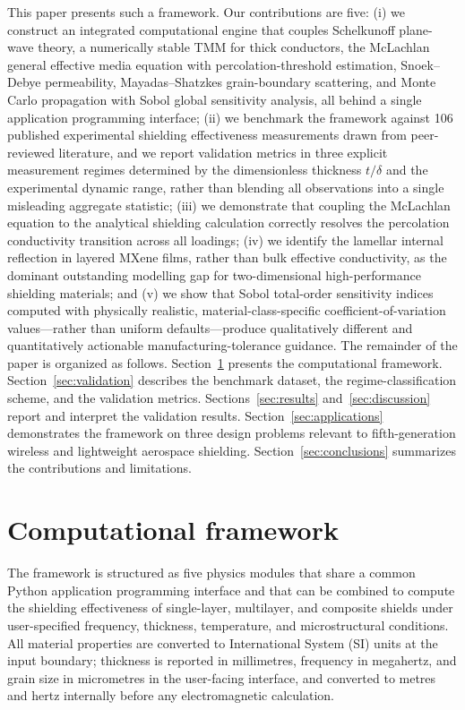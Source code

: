 \documentclass[review,3p,authoryear]{elsarticle}
\begin{document}
This paper presents such a framework. Our contributions are five: (i) we construct an integrated computational engine that couples Schelkunoff plane-wave theory, a numerically stable TMM for thick conductors, the McLachlan general effective media equation with percolation-threshold estimation, Snoek--Debye permeability, Mayadas--Shatzkes grain-boundary scattering, and Monte Carlo propagation with Sobol global sensitivity analysis, all behind a single application programming interface; (ii) we benchmark the framework against \num{106} published experimental shielding effectiveness measurements drawn from peer-reviewed literature, and we report validation metrics in three explicit measurement regimes determined by the dimensionless thickness $t/\delta$ and the experimental dynamic range, rather than blending all observations into a single misleading aggregate statistic; (iii) we demonstrate that coupling the McLachlan equation to the analytical shielding calculation correctly resolves the percolation conductivity transition across all loadings; (iv) we identify the lamellar internal reflection in layered MXene films, rather than bulk effective conductivity, as the dominant outstanding modelling gap for two-dimensional high-performance shielding materials; and (v) we show that Sobol total-order sensitivity indices computed with physically realistic, material-class-specific coefficient-of-variation values---rather than uniform defaults---produce qualitatively different and quantitatively actionable manufacturing-tolerance guidance. The remainder of the paper is organized as follows. Section~\ref{sec:framework} presents the computational framework. Section~\ref{sec:validation} describes the benchmark dataset, the regime-classification scheme, and the validation metrics. Sections~\ref{sec:results} and~\ref{sec:discussion} report and interpret the validation results. Section~\ref{sec:applications} demonstrates the framework on three design problems relevant to fifth-generation wireless and lightweight aerospace shielding. Section~\ref{sec:conclusions} summarizes the contributions and limitations.

\section{Computational framework}
\label{sec:framework}

The framework is structured as five physics modules that share a common Python application programming interface and that can be combined to compute the shielding effectiveness of single-layer, multilayer, and composite shields under user-specified frequency, thickness, temperature, and microstructural conditions. All material properties are converted to International System (SI) units at the input boundary; thickness is reported in millimetres, frequency in megahertz, and grain size in micrometres in the user-facing interface, and converted to metres and hertz internally before any electromagnetic calculation.
\end{document}
